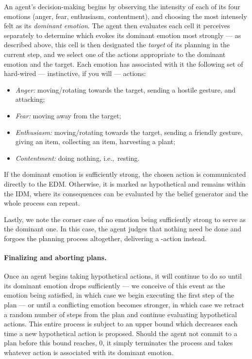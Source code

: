 An agent's decision-making begins by observing the intensity of each of its four emotions (anger, fear, enthusiasm, contentment), and choosing the most intensely felt as its {\em dominant emotion}. The agent then evaluates each cell it perceives separately to determine which evokes its dominant emotion most strongly --- as described above, this cell is then designated the {\em target} of its planning in the current step, and we select one of the actions appropriate to the dominant emotion and the target. Each emotion has associated with it the following set of hard-wired --- instinctive, if you will --- actions:

\begin{itemize}
	\item \emph{Anger:} moving/rotating towards the target, sending a hostile gesture, and attacking;
	\item \emph{Fear:} moving away from the target;
	\item \emph{Enthusiasm:} moving/rotating towards the target, sending a friendly gesture, giving an item, collecting an item, harvesting a plant;
	\item \emph{Contentment:} doing nothing, i.e.,\ resting.
\end{itemize}

If the dominant emotion is sufficiently strong, the chosen action is communicated directly to the EDM. Otherwise, it is marked as hypothetical and remains within the IDM, where its consequences can be evaluated by the belief generator and the whole process can repeat.

Lastly, we note the corner case of no emotion being sufficiently strong to serve as the dominant one. In this case, the agent judges that nothing need be done and forgoes the planning process altogether, delivering a -action instead.

\paragraph{Finalizing and aborting plans.} Once an agent begins taking hypothetical actions, it will continue to do so until its dominant emotion drops sufficiently --- we conceive of this event as the emotion being satisfied, in which case we begin executing the first step of the plan --- or until a conflicting emotion becomes stronger, in which case we retract a random number of steps from the plan and continue evaluating hypothetical actions. This entire process is subject to an upper bound which decreases each time a new hypothetical action is proposed. Should the agent not commit to a plan before this bound reaches, 0, it simply terminates the process and takes whatever action is associated with its dominant emotion.


